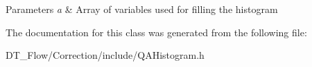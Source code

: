 \begin{DoxyParams}{Parameters}
{\em a} & Array of variables used for filling the histogram \\
\hline
\end{DoxyParams}


The documentation for this class was generated from the following file\+:\begin{DoxyCompactItemize}
\item 
D\+T\+\_\+\+Flow/\+Correction/include/Q\+A\+Histogram.\+h\end{DoxyCompactItemize}

